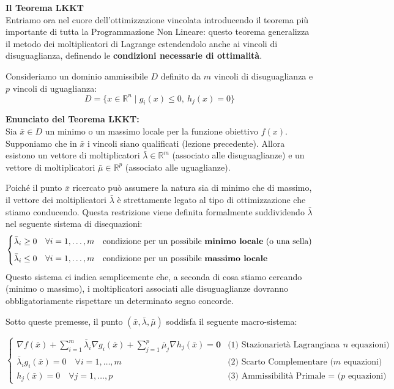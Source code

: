 \documentclass[12pt, a4paper]{article}
\newcommand{\separatore}{\noindent{\color{titlecolor!50}\rule{\textwidth}{0.6pt}}}
\begin{document}
	\vspace{0.6cm}
	\separatore
	\vspace{0.4cm}
	
	\textbf{Il Teorema LKKT}\\[0.2cm]
	Entriamo ora nel cuore dell'ottimizzazione vincolata introducendo il teorema più importante di tutta la Programmazione Non Lineare: questo teorema generalizza il metodo dei moltiplicatori di Lagrange estendendolo anche ai vincoli di disuguaglianza, definendo le \textbf{condizioni necessarie di ottimalità}.
	
	Consideriamo un dominio ammissibile $D$ definito da $m$ vincoli di disuguaglianza e $p$ vincoli di uguaglianza:
	\[ D = \{ x \in \mathbb{R}^n \mid g_i(x) \le 0, \ h_j(x) = 0 \} \]
	
	\textbf{Enunciato del Teorema LKKT:}\\
	Sia $\bar{x} \in D$ un minimo o un massimo locale per la funzione obiettivo $f(x)$. 
	Supponiamo che in $\bar{x}$ i vincoli siano qualificati (lezione precedente). 
	Allora esistono un vettore di moltiplicatori \textbf{$\bar{\lambda} \in \mathbb{R}^m$} (associato alle disuguaglianze) e un vettore di moltiplicatori \textbf{$\bar{\mu} \in \mathbb{R}^p$} (associato alle uguaglianze).
	
	Poiché il punto $\bar{x}$ ricercato può assumere la natura sia di minimo che di massimo, il vettore dei moltiplicatori $\bar{\lambda}$ è strettamente legato al tipo di ottimizzazione che stiamo conducendo. Questa restrizione viene definita formalmente suddividendo $\bar{\lambda}$ nel seguente sistema di disequazioni:
	\[
	\begin{cases}
		\bar{\lambda}_i \ge 0 \quad \forall i=1,\dots,m & \text{condizione per un possibile \textbf{minimo locale} (o una sella)} \\[6pt]
		\bar{\lambda}_i \le 0 \quad \forall i=1,\dots,m & \text{condizione per un possibile \textbf{massimo locale}}
	\end{cases}
	\]
	Questo sistema ci indica semplicemente che, a seconda di cosa stiamo cercando (minimo o massimo), i moltiplicatori associati alle disuguaglianze dovranno obbligatoriamente rispettare un determinato segno concorde.
	
	Sotto queste premesse, il punto $(\bar{x}, \bar{\lambda}, \bar{\mu})$ soddisfa il seguente macro-sistema:
	
	\[
	\begin{cases}
		\nabla f(\bar{x}) + \displaystyle\sum_{i=1}^{m} \bar{\lambda}_i \nabla g_i(\bar{x}) + \displaystyle\sum_{j=1}^{p} \bar{\mu}_j \nabla h_j(\bar{x}) = \mathbf{0} & \text{(1) Stazionarietà Lagrangiana (} n \text{ equazioni)} \\[10pt]
		\bar{\lambda}_i g_i(\bar{x}) = 0 \quad \forall i=1,\dots,m & \text{(2) Scarto Complementare (} m \text{ equazioni)} \\[5pt]
		h_j(\bar{x}) = 0 \quad \forall j=1,\dots,p & \text{(3) Ammissibilità Primale = (} p \text{ equazioni)}
	\end{cases}
	\]
	
\end{document}
